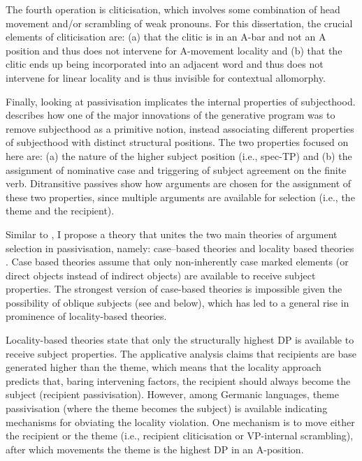  The fourth operation is cliticisation, which involves some combination of head movement and/or scrambling of weak pronouns. For this dissertation, the crucial elements of cliticisation are: (a) that the clitic is in an A-bar and not an A position and thus does not intervene for A-movement locality and (b) that the clitic ends up being incorporated into an adjacent word and thus does not intervene for linear locality and is thus invisible for contextual allomorphy.

Finally, looking at passivisation implicates the internal properties of subjecthood. \cite{McCloskey.1997} describes how one of the major innovations of the generative program was to remove subjecthood as a primitive notion, instead associating different properties of subjecthood with distinct structural positions. The two properties focused on here are: (a) the nature of the higher subject position (i.e., spec-TP) and (b) the assignment of nominative case and triggering of subject agreement on the finite verb. Ditransitive passives show how arguments are chosen for the assignment of these two properties, since multiple arguments are available for selection (i.e., the theme and the recipient).

Similar to \cite{Platzack.2005}, I propose a theory that unites the two main theories of argument selection in passivisation, namely: case--based theories \citep{Larson.1988,Baker.1988,Pesetsky.1996,Holmberg.2001} and locality based theories \citep{Falk.1990,Holmberg.1995,McGinnis.1998,Anagnostopoulou.2003}.  Case based theories assume that only non-inherently case marked elements (or direct objects instead of indirect objects) are available to receive subject properties. The strongest version of case-based theories is impossible given the possibility of oblique subjects (see \citealt{Zaenen.1985} and below), which has led to a general rise in prominence of locality-based theories.

Locality-based theories state that only the structurally highest DP is available to receive subject properties. The applicative analysis claims that recipients are base generated higher than the theme, which means that the locality approach predicts that, baring intervening factors, the recipient should always become the subject (recipient passivisation). However, among Germanic languages, theme passivisation (where the theme becomes the subject) is available indicating mechanisms for obviating the locality violation. One mechanism is to move either the recipient or the theme (i.e., recipient cliticisation or VP-internal scrambling), after which movements the theme is the highest DP in an A-position.

